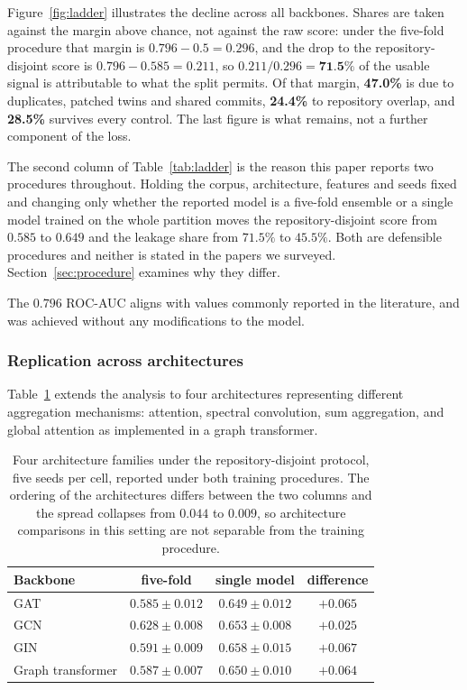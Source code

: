 Figure~\ref{fig:ladder} illustrates the decline across all backbones. Shares
are taken against the margin above chance, not against the raw score: under the
five-fold procedure that margin is $0.796-0.5=0.296$, and the drop to the
repository-disjoint score is $0.796-0.585=0.211$, so
$0.211/0.296 = \textbf{71.5\%}$ of the usable signal is attributable to what the
split permits. Of that margin, \textbf{47.0\%} is due to duplicates, patched
twins and shared commits, \textbf{24.4\%} to repository overlap, and
\textbf{28.5\%} survives every control. The last figure is what remains, not a
further component of the loss.

The second column of Table~\ref{tab:ladder} is the reason this paper reports
two procedures throughout. Holding the corpus, architecture, features and seeds
fixed and changing only whether the reported model is a five-fold ensemble or a
single model trained on the whole partition moves the repository-disjoint score
from $0.585$ to $0.649$ and the leakage share from $71.5\%$ to $45.5\%$. Both
are defensible procedures and neither is stated in the papers we surveyed.
Section~\ref{sec:procedure} examines why they differ.

The $0.796$ ROC-AUC aligns with values commonly reported in the literature, and was achieved without any modifications to the model.

\subsubsection{Replication across architectures}
Table~\ref{tab:arch} extends the analysis to four architectures representing different aggregation mechanisms: attention, spectral convolution, sum aggregation, and global attention as implemented in a graph transformer.

\begin{table}[h]
\centering
\caption{Four architecture families under the repository-disjoint protocol,
five seeds per cell, reported under both training procedures. The ordering of
the architectures differs between the two columns and the spread collapses from
$0.044$ to $0.009$, so architecture comparisons in this setting are not
separable from the training procedure.}
\label{tab:arch}
\begin{tabular}{lccc}
\toprule
\textbf{Backbone} & \textbf{five-fold} & \textbf{single model} & \textbf{difference} \\
\midrule
GAT               & $0.585 \pm 0.012$ & $0.649 \pm 0.012$ & $+0.065$ \\
GCN               & $0.628 \pm 0.008$ & $0.653 \pm 0.008$ & $+0.025$ \\
GIN               & $0.591 \pm 0.009$ & $0.658 \pm 0.015$ & $+0.067$ \\
Graph transformer & $0.587 \pm 0.007$ & $0.650 \pm 0.010$ & $+0.064$ \\
\bottomrule
\end{tabular}
\end{table}

